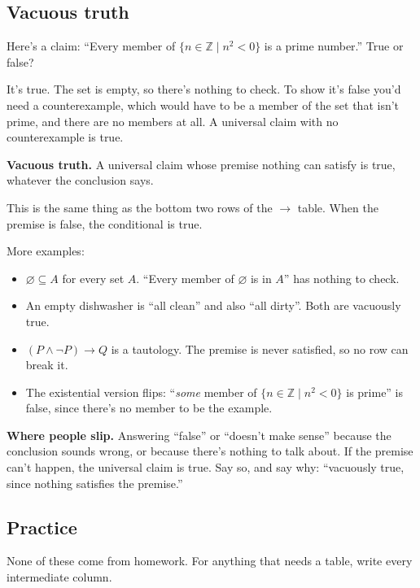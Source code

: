 \subsection{Vacuous truth}

Here's a claim: ``Every member of $\{n\in\mathbb{Z}\mathrel{|} n^2<0\}$ is a prime number.'' True or false?

It's true. The set is empty, so there's nothing to check. To show it's false you'd need a counterexample, which would have to be a member of the set that isn't prime, and there are no members at all. A universal claim with no counterexample is true.

\begin{notebox}
\textbf{Vacuous truth.} A universal claim whose premise nothing can satisfy is true, whatever the conclusion says.
\end{notebox}

This is the same thing as the bottom two rows of the $\to$ table. When the premise is false, the conditional is true.

More examples:
\begin{itemize}
  \item $\varnothing\subseteq A$ for every set $A$. ``Every member of $\varnothing$ is in $A$'' has nothing to check.
  \item An empty dishwasher is ``all clean'' and also ``all dirty''. Both are vacuously true.
  \item $(P\land\lnot P)\to Q$ is a tautology. The premise is never satisfied, so no row can break it.
  \item The existential version flips: ``\emph{some} member of $\{n\in\mathbb{Z}\mathrel{|} n^2<0\}$ is prime'' is false, since there's no member to be the example.
\end{itemize}

\textbf{Where people slip.} Answering ``false'' or ``doesn't make sense'' because the conclusion sounds wrong, or because there's nothing to talk about. If the premise can't happen, the universal claim is true. Say so, and say why: ``vacuously true, since nothing satisfies the premise.''

\subsection{Practice}

None of these come from homework. For anything that needs a table, write every intermediate column.

